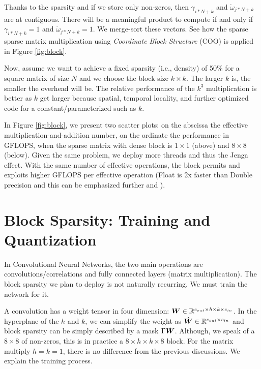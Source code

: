 \documentclass[sigconf]{acmart}
\begin{document}
Thanks to the sparsity and if we store only non-zeros, then
$\gamma_{i*N+k}$ and $\dot{\omega}_{j*N+k}$ are at contiguous. There
will be a meaningful product to compute if and only if $\gamma_{i*N+k}
=1$ and $\dot{\omega}_{j*N+k} =1$.  We merge-sort these vectors.  See
how the sparse sparse matrix multiplication using {\em Coordinate
  Block Structure} (COO) is applied in Figure \ref{fig:block}.
\begin{comment}
  We provide software to reproduce this. %
\end{comment}
Now, assume we want to achieve a fixed sparsity (i.e., density) of
50\% for a square matrix of size $N$ and we choose the block size $k
\times k$. The larger $k$ is, the smaller the overhead will be.  The
relative performance of the $k^3$ multiplication is better as $k$ get
larger because spatial, temporal locality, and further optimized code
for a constant/parameterized such as $k$.


In Figure \ref{fig:block}, we present two scatter plots: on the
abscissa the effective multiplication-and-addition number, on the
ordinate the performance in GFLOPS, when the sparse matrix with dense
block is $1\times 1$ (above) and $8\times8$ (below). Given the same
problem, we deploy more threads and thus the Jenga effect.  With the
same number of effective operations, the block permits and exploits
higher GFLOPS per effective operation (Float is 2x faster than Double
precision and this can be emphasized further
\cite{Gray2017GPUKF,li2023popsparse} and \cite{pmlr-v119-kurtz20a}).


\section{Block Sparsity: Training and Quantization}
\label{sec:training}

In Convolutional Neural Networks, the two main operations are
convolutions/correlations and fully connected layers (matrix
multiplication). The block sparsity we plan to deploy is not naturally
recurring.  We must train the network for it.

A convolution has a weight tensor in four dimension: ${\boldsymbol W} \in
\mathbb{R}^{c_{out}\times h \times k \times c_{in}}$. In the hyperplane of the
$h$ and $k$, we can simplify the weight as $\dot{{\boldsymbol W}} \in
\mathbb{R}^{c_{out} \times c_{in}}$ and block sparsity can be simply described
by a mask $\Gamma\dot{{\boldsymbol W}}$. Although, we speak of a $8\times 8$ of
non-zeros, this is in practice a $8\times h\times k\times 8$
block. For the matrix multiply $h=k=1$, there is no difference from
the previous discussions. We explain the training process.
\end{document}

